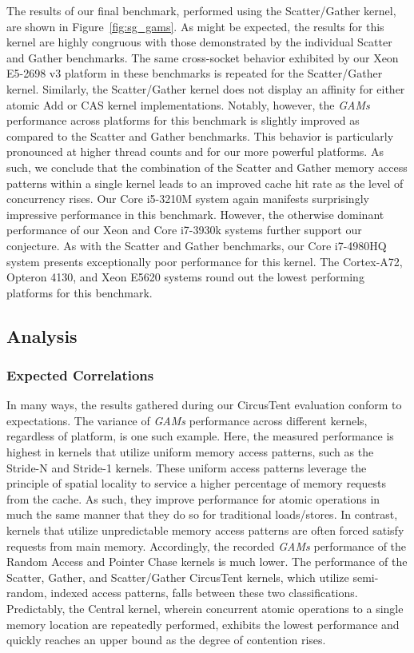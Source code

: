 The results of our final benchmark, performed using the Scatter/Gather kernel, are shown in Figure~\ref{fig:sg_gams}.
As might be expected, the results for this kernel are highly congruous with those demonstrated by the individual Scatter and Gather benchmarks.
The same cross-socket behavior exhibited by our Xeon E5-2698 v3 platform in these benchmarks is repeated for the Scatter/Gather kernel.
Similarly, the Scatter/Gather kernel does not display an affinity for either atomic Add or CAS kernel implementations.
Notably, however, the \textit{GAMs} performance across platforms for this benchmark is slightly improved as compared to the Scatter and Gather benchmarks.
This behavior is particularly pronounced at higher thread counts and for our more powerful platforms.
As such, we conclude that the combination of the Scatter and Gather memory access patterns within a single kernel leads to an improved cache hit rate as the level of concurrency rises.
Our Core i5-3210M system again manifests surprisingly impressive performance in this benchmark.
However, the otherwise dominant performance of our Xeon and Core i7-3930k systems further support our conjecture.
As with the Scatter and Gather benchmarks, our Core i7-4980HQ system presents exceptionally poor performance for this kernel.
The Cortex-A72, Opteron 4130, and Xeon E5620 systems round out the lowest performing platforms for this benchmark.

\subsection{Analysis}
\label{subsec:analysis}

\subsubsection{Expected Correlations}
\label{subsubsec:expected_correlations}

In many ways, the results gathered during our CircusTent evaluation conform to expectations.
The variance of \textit{GAMs} performance across different kernels, regardless of platform, is one such example.
Here, the measured performance is highest in kernels that utilize uniform memory access patterns, such as the Stride-N and Stride-1 kernels.
These uniform access patterns leverage the principle of spatial locality to service a higher percentage of memory requests from the cache.
As such, they improve performance for atomic operations in much the same manner that they do so for traditional loads/stores.
In contrast, kernels that utilize unpredictable memory access patterns are often forced satisfy requests from main memory.
Accordingly, the recorded \textit{GAMs} performance of the Random Access and Pointer Chase kernels is much lower.
The performance of the Scatter, Gather, and Scatter/Gather CircusTent kernels, which utilize semi-random, indexed access patterns, falls between these two classifications.
Predictably, the Central kernel, wherein concurrent atomic operations to a single memory location are repeatedly performed, exhibits the lowest performance and quickly reaches an upper bound as the degree of contention rises.

